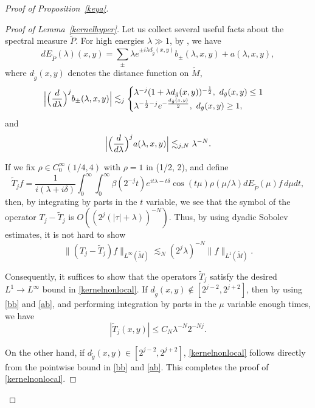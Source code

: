 \documentclass[10pt]{amsart}
\newcommand{\la}{\lambda}
\newcommand{\1}{{\bf 1}}
\begin{document}
\begin{proof}[Proof of Proposition~\ref{keya}]
\begin{proof}[Proof of Lemma~\ref{kernelhyper}]
Let us collect several useful facts about the spectral measure $\tilde P$. 
For high energies $\la\gg 1$, by \cite[Theorem 1.3]{ChHa}, we have 
\begin{equation}
    dE_{\tilde P} (\la)(x,y)=\sum_\pm\la e^{\pm i\la d_{\tilde g}(x,y)}b_\pm(\la,x,y)+a(\la,x,y),
\end{equation}
where $d_{\tilde g}(x,y)$ denotes the distance function on $\tilde M$,
\begin{equation}\label{bb}
 \Bigl|\Bigl( \frac{d}{d\la} \Bigr)^j b_\pm(\la,x,y)\Bigr| \lesssim_j \begin{cases}
      \la^{-j}(1+\la d_{\tilde g}(x,y))^{-\frac12},\,\, d_{\tilde g}(x,y)\le 1\\
      \la^{-\frac12-j}e^{-\frac{d_{\tilde g}(x,y)}{2}},\,\, d_{\tilde g}(x,y)\ge 1,
  \end{cases}
\end{equation}
and 
\begin{equation}\label{ab}
 \Bigl|\Bigl( \frac{d}{d\la} \Bigr)^ja(\la,x,y)\Bigr|\lesssim_{j,N} 
      \la^{-N}.
\end{equation}


If we fix $\rho\in C_0^\infty(1/4, 4)$ with $\rho=1$ in (1/2, 2), and define
\begin{equation}\label{tjb}
\tilde T_j f=\frac1{i(\la+i\delta)} \int_0^\infty \int_0^\infty \beta(2^{-j}t)e^{it\la-t\delta}\cos (t\mu)\rho(\mu/\la) dE_{\tilde P} (\mu) f\, d\mu dt,
\end{equation}
then, by  integrating by parts in the $t$ variable, we see that  the symbol of the operator $T_j-\tilde T_j$ is $O\left((2^j(|\tau|+\la))^{-N}\right)$. Thus, by using dyadic Sobolev estimates, it is not hard to show
 \begin{equation}\label{kernelnonlocala}
\|(T_j-\tilde T_j) f\|_{L^\infty(\tilde M)}\lesssim_N(2^j\la)^{-N} \|f\|_{L^1(\tilde M)}. 
\end{equation}


 Consequently, it suffices to show that the operators $\tilde T_j$ satisfy the desired $L^1\to L^\infty$  bound in \eqref{kernelnonlocal}.
If $d_{\tilde g}(x,y)\notin [2^{j-2}, 2^{j+2}]$, then by using \eqref{bb} and \eqref{ab}, and performing integration by parts in the $\mu$ variable enough times, we have 
\begin{equation}\label{c}
|\tilde T_j (x,y)|\le C_{N} \lambda^{-N}2^{-Nj}.
\end{equation}

On the other hand, if $d_{\tilde g}(x,y)\in [2^{j-2}, 2^{j+2}]$, \eqref{kernelnonlocal} follows directly from the pointwise bound in  \eqref{bb} and \eqref{ab}. This completes the proof of \eqref{kernelnonlocal}.
\end{proof}




\end{proof}
\end{document}
